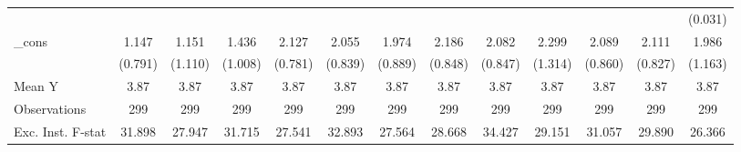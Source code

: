 {\begin{tabular}{l*{12}{c}}
            &                     &                     &                     &                     &                     &                     &                     &                     &                     &                     &                     &     (0.031)         \\
\addlinespace
\_cons      &       1.147         &       1.151         &       1.436         &       2.127\sym{**} &       2.055\sym{**} &       1.974\sym{**} &       2.186\sym{**} &       2.082\sym{**} &       2.299\sym{*}  &       2.089\sym{**} &       2.111\sym{**} &       1.986         \\
            &     (0.791)         &     (1.110)         &     (1.008)         &     (0.781)         &     (0.839)         &     (0.889)         &     (0.848)         &     (0.847)         &     (1.314)         &     (0.860)         &     (0.827)         &     (1.163)         \\
\midrule
Mean Y      &        3.87         &        3.87         &        3.87         &        3.87         &        3.87         &        3.87         &        3.87         &        3.87         &        3.87         &        3.87         &        3.87         &        3.87         \\
Observations&         299         &         299         &         299         &         299         &         299         &         299         &         299         &         299         &         299         &         299         &         299         &         299         \\
Exc. Inst. F-stat&      31.898         &      27.947         &      31.715         &      27.541         &      32.893         &      27.564         &      28.668         &      34.427         &      29.151         &      31.057         &      29.890         &      26.366         \\
\bottomrule
\end{tabular}
}
